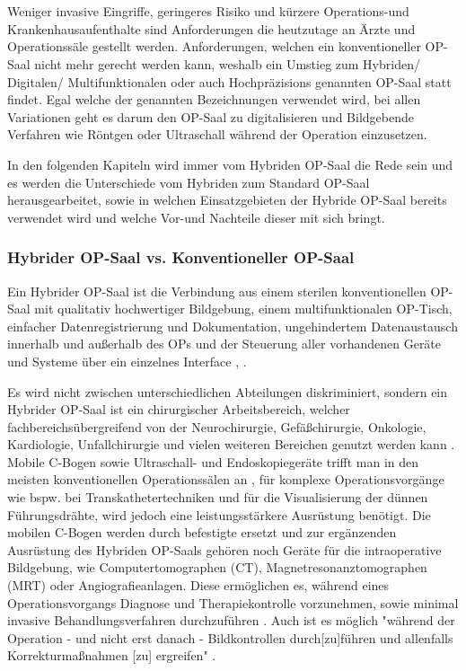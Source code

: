 \chapter{}
\label{sec:overview}

Weniger invasive Eingriffe, geringeres Risiko und kürzere Operations-und Krankenhausaufenthalte sind Anforderungen die heutzutage an Ärzte und Operationssäle gestellt werden. Anforderungen, welchen ein konventioneller OP-Saal nicht mehr gerecht werden kann, weshalb ein Umstieg zum Hybriden/ Digitalen/ Multifunktionalen oder auch Hochpräzisions genannten OP-Saal statt findet. Egal welche der genannten Bezeichnungen verwendet wird, bei allen Variationen geht es darum den OP-Saal zu digitalisieren und Bildgebende Verfahren wie Röntgen oder Ultraschall während der Operation einzusetzen.

In den folgenden Kapiteln wird immer vom Hybriden OP-Saal die Rede sein und es werden die Unterschiede vom Hybriden zum Standard OP-Saal herausgearbeitet, sowie in welchen Einsatzgebieten der Hybride OP-Saal bereits verwendet wird und welche Vor-und Nachteile dieser mit sich bringt.


\subsection{Hybrider OP-Saal vs. Konventioneller OP-Saal} 

Ein Hybrider OP-Saal ist die Verbindung aus einem sterilen konventionellen OP-Saal mit qualitativ hochwertiger Bildgebung, einem multifunktionalen OP-Tisch, einfacher Datenregistrierung und Dokumentation, ungehindertem Datenaustausch innerhalb und außerhalb des OPs und der Steuerung aller vorhandenen Geräte und Systeme über ein einzelnes Interface \cite{HybriderVsKonventioneller}, \cite{KarlStorz}. 

Es wird nicht zwischen unterschiedlichen Abteilungen diskriminiert, sondern ein Hybrider OP-Saal ist ein chirurgischer Arbeitsbereich, welcher fachbereichsübergreifend von der Neurochirurgie, Gefäßchirurgie, Onkologie, Kardiologie, Unfallchirurgie und vielen weiteren Bereichen genutzt werden kann \cite{Getinge}.
Mobile C-Bogen sowie Ultraschall- und Endoskopiegeräte trifft man in den meisten konventionellen Operationssälen an \cite{TechnicalConsiderations}, für komplexe Operationsvorgänge wie bspw. bei Transkathetertechniken und für die Visualisierung der dünnen Führungsdrähte, wird jedoch eine leistungsstärkere Ausrüstung benötigt. Die mobilen C-Bogen werden durch befestigte ersetzt und zur ergänzenden Ausrüstung des Hybriden OP-Saals gehören noch Geräte für die intraoperative Bildgebung, wie Computertomographen (CT), Magnetresonanztomographen (MRT) oder Angiografieanlagen. Diese ermöglichen es, während eines Operationsvorgangs Diagnose und Therapiekontrolle vorzunehmen, sowie minimal invasive Behandlungsverfahren durchzuführen \cite{SHG-Kliniken}. Auch ist es möglich "während der Operation - und nicht erst danach - Bildkontrollen durch[zu]führen und allenfalls Korrekturmaßnahmen [zu] ergreifen" \cite{OPderZukunft}.

